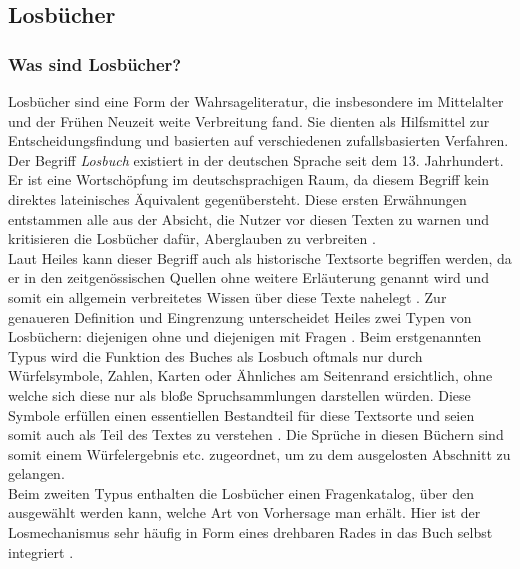 \documentclass[12pt,a4paper]{article}
\begin{document}
	\subsection{Losbücher}
		\subsubsection{Was sind Losbücher?}
			Losbücher sind eine Form der Wahrsageliteratur, die insbesondere im Mittelalter und der Frühen Neuzeit weite Verbreitung fand. Sie dienten als Hilfsmittel zur Entscheidungsfindung und basierten auf 
			verschiedenen zufallsbasierten Verfahren. 
			Der Begriff \textit{Losbuch} existiert in der deutschen Sprache seit dem 13. Jahrhundert. Er ist eine Wortschöpfung im deutschsprachigen Raum, da diesem Begriff kein 
			direktes lateinisches Äquivalent gegenübersteht. Diese ersten Erwähnungen entstammen alle aus der Absicht, die Nutzer vor diesen Texten zu warnen und kritisieren die 
			Losbücher dafür, Aberglauben zu verbreiten \parencite[S.~23 f.]{heiles}.\\
			Laut Heiles kann dieser Begriff auch als historische Textsorte begriffen werden, da er in den zeitgenössischen Quellen ohne weitere Erläuterung genannt wird und 
			somit ein allgemein verbreitetes Wissen über diese Texte nahelegt \parencite[S.~26]{heiles}.
			Zur genaueren Definition und Eingrenzung unterscheidet Heiles zwei Typen von Losbüchern: diejenigen ohne und diejenigen mit Fragen \parencite[S.~39]{heiles}. Beim 
			erstgenannten Typus wird die Funktion des Buches als Losbuch oftmals nur durch Würfelsymbole, Zahlen, Karten oder Ähnliches am Seitenrand ersichtlich, ohne welche 
			sich diese nur als bloße Spruchsammlungen darstellen würden. Diese Symbole erfüllen einen essentiellen Bestandteil für diese Textsorte und seien somit auch als Teil des Textes 
			zu verstehen \parencite[S.~46]{heiles}. Die Sprüche in diesen Büchern sind somit einem Würfelergebnis etc. zugeordnet, um zu dem ausgelosten Abschnitt zu gelangen.\\
			Beim zweiten Typus enthalten die Losbücher einen Fragenkatalog, über den ausgewählt werden kann, welche Art von Vorhersage man erhält. Hier ist der Losmechanismus sehr 
			häufig in Form eines drehbaren Rades in das Buch selbst integriert \parencite[S.~56]{heiles}.
\end{document}
